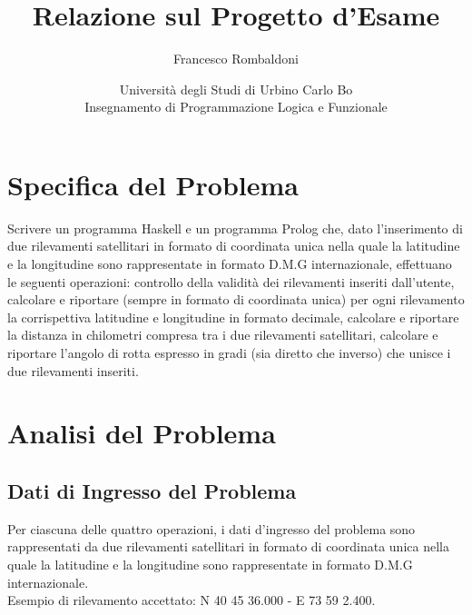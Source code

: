 \documentclass{article}
\title{\textbf{Relazione sul Progetto d'Esame}}
\author{Francesco Rombaldoni}
\date{\small Università degli Studi di Urbino Carlo Bo\\
	Insegnamento di Programmazione Logica e Funzionale}
\begin{document}
	\maketitle
	
	

\section{Specifica del Problema}
Scrivere un programma Haskell e un programma Prolog che, dato l'inserimento di due rilevamenti satellitari in formato di coordinata unica nella quale la latitudine e la longitudine sono rappresentate in formato D.M.G internazionale, effettuano le seguenti operazioni: controllo della validità dei rilevamenti inseriti dall'utente, calcolare e riportare (sempre in formato di coordinata unica) per ogni rilevamento la corrispettiva latitudine e longitudine in formato decimale, calcolare e riportare la distanza in chilometri compresa tra i due rilevamenti satellitari, calcolare e riportare l'angolo di rotta espresso in gradi (sia diretto che inverso) che unisce i due rilevamenti inseriti.
\newline
\newline
\newpage
			
\section{Analisi del Problema}
\subsection{Dati di Ingresso del Problema}
Per ciascuna delle quattro operazioni, i dati d'ingresso del problema sono rappresentati da due rilevamenti satellitari in formato di coordinata unica nella quale la latitudine e la longitudine sono rappresentate in formato D.M.G internazionale. \\
Esempio di rilevamento accettato: N 40 45 36.000 - E 73 59 2.400.
\end{document}
